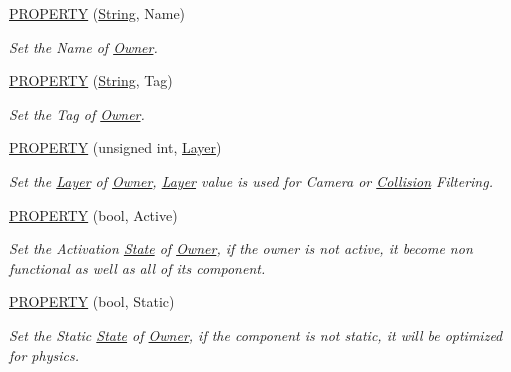 \begin{DoxyCompactItemize}
\item 
\hyperlink{class_i_dream_sky_1_1_component_1_1_owner_acb9041a5face4c323f84dc6596adb929}{P\+R\+O\+P\+E\+R\+TY} (\hyperlink{class_i_dream_sky_1_1_string}{String}, Name)
\begin{DoxyCompactList}\small\item\em Set the Name of \hyperlink{class_i_dream_sky_1_1_component_1_1_owner}{Owner}. \end{DoxyCompactList}\item 
\hyperlink{class_i_dream_sky_1_1_component_1_1_owner_adb28ccfc433865c1749d70ea50456a65}{P\+R\+O\+P\+E\+R\+TY} (\hyperlink{class_i_dream_sky_1_1_string}{String}, Tag)
\begin{DoxyCompactList}\small\item\em Set the Tag of \hyperlink{class_i_dream_sky_1_1_component_1_1_owner}{Owner}. \end{DoxyCompactList}\item 
\hyperlink{class_i_dream_sky_1_1_component_1_1_owner_a0a2a29058eb7b307d9ab09af3e77da34}{P\+R\+O\+P\+E\+R\+TY} (unsigned int, \hyperlink{class_i_dream_sky_1_1_layer}{Layer})
\begin{DoxyCompactList}\small\item\em Set the \hyperlink{class_i_dream_sky_1_1_layer}{Layer} of \hyperlink{class_i_dream_sky_1_1_component_1_1_owner}{Owner}, \hyperlink{class_i_dream_sky_1_1_layer}{Layer} value is used for Camera or \hyperlink{class_i_dream_sky_1_1_collision}{Collision} Filtering. \end{DoxyCompactList}\item 
\hyperlink{class_i_dream_sky_1_1_component_1_1_owner_afa19771c62427082ab97fefedd2a605b}{P\+R\+O\+P\+E\+R\+TY} (bool, Active)
\begin{DoxyCompactList}\small\item\em Set the Activation \hyperlink{class_i_dream_sky_1_1_state}{State} of \hyperlink{class_i_dream_sky_1_1_component_1_1_owner}{Owner}, if the owner is not active, it become non functional as well as all of its component. \end{DoxyCompactList}\item 
\hyperlink{class_i_dream_sky_1_1_component_1_1_owner_acdd61d0ba74988520569d21181c02cc6}{P\+R\+O\+P\+E\+R\+TY} (bool, Static)
\begin{DoxyCompactList}\small\item\em Set the Static \hyperlink{class_i_dream_sky_1_1_state}{State} of \hyperlink{class_i_dream_sky_1_1_component_1_1_owner}{Owner}, if the component is not static, it will be optimized for physics. \end{DoxyCompactList}\item 

\end{DoxyCompactItemize}
